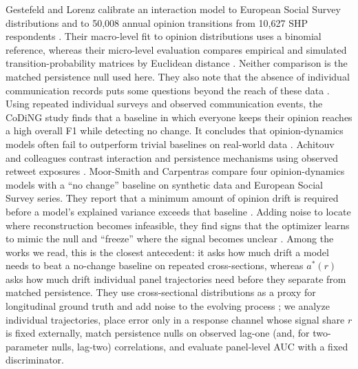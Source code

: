
Gestefeld and Lorenz calibrate an interaction model to European Social Survey distributions and to 50,008 annual opinion transitions from 10,627 SHP respondents \cite{gestefeld2023}.
Their macro-level fit to opinion distributions uses a binomial reference, whereas their micro-level evaluation compares empirical and simulated transition-probability matrices by Euclidean distance \cite{gestefeld2023}. %
Neither comparison is the matched persistence null used here. They also note that the absence of individual communication records puts some questions beyond the reach of these data \cite{gestefeld2023}. %
Using repeated individual surveys and observed communication events, the CoDiNG study finds that a baseline in which everyone keeps their opinion reaches a high overall F1 while detecting no change. It concludes that opinion-dynamics models often fail to outperform trivial baselines on real-world data \cite{coding2024}.
Achitouv and colleagues contrast interaction and persistence mechanisms using observed retweet exposures \cite{achitouv2026}.
Moor-Smith and Carpentras compare four opinion-dynamics models with a ``no change'' baseline on synthetic data and European Social Survey series. They report that a minimum amount of opinion drift is required before a model's explained variance exceeds that baseline \cite{moor2026}.
Adding noise to locate where reconstruction becomes infeasible, they find signs that the optimizer learns to mimic the null and ``freeze'' where the signal becomes unclear \cite{moor2026}.
Among the works we read, this is the closest antecedent: it asks how much drift a model needs to beat a no-change baseline on repeated cross-sections, whereas $a^*(r)$ asks how much drift individual panel trajectories need before they separate from matched persistence.
They use cross-sectional distributions as a proxy for longitudinal ground truth and add noise to the evolving process \cite{moor2026}; we analyze individual trajectories, place error only in a response channel whose signal share $r$ is fixed externally, match persistence nulls on observed lag-one (and, for two-parameter nulls, lag-two) correlations, and evaluate panel-level AUC with a fixed discriminator.

